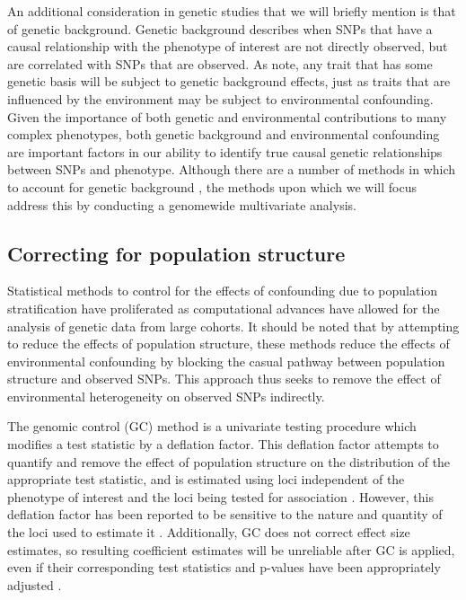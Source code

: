 An additional consideration in genetic studies that we will briefly mention is that of genetic background. Genetic background describes when SNPs that have a causal relationship with the phenotype of interest are not directly observed, but are correlated with SNPs that are observed. As \cite{vilhjalmsson2012nature} note, any trait that has some genetic basis will be subject to genetic background effects, just as traits that are influenced by the environment may be subject to environmental confounding. Given the importance of both genetic and environmental contributions to many complex phenotypes, both genetic background and environmental confounding are important factors in our ability to identify true causal genetic relationships between SNPs and phenotype. Although there are a number of methods in which to account for genetic background , the methods upon which we will focus address this by conducting a genomewide multivariate analysis.

\subsection{Correcting for population structure}

Statistical methods to control for the effects of confounding due to population stratification have proliferated as computational advances have allowed for the analysis of genetic data from large cohorts. It should be noted that by attempting to reduce the effects of population structure, these methods reduce the effects of environmental confounding by blocking the casual pathway between population structure and observed SNPs. This approach thus seeks to remove the effect of environmental heterogeneity on observed SNPs indirectly.


The genomic control (GC) method is a univariate testing procedure which modifies a test statistic by a deflation factor. This deflation factor attempts to quantify and remove the effect of population structure on the distribution of the appropriate test statistic, and is estimated using loci independent of the phenotype of interest and the loci being tested for association \cite{devlin1999genomic, bacanu2000power, wang2009testing}. However, this deflation factor has been reported to be sensitive to the nature and quantity of the loci used to estimate it \cite{hellwege2017population, marchini2004effects}. Additionally, GC does not correct effect size estimates, so resulting coefficient estimates will be unreliable after GC is applied, even if their corresponding test statistics and p-values have been appropriately adjusted \cite{hellwege2017population}.

